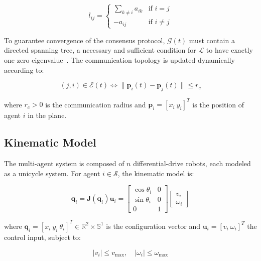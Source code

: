 \begin{equation}
    l_{ij} =
    \begin{cases}
        \sum_{k \neq i} a_{ik} & \text{if } i = j \\
        -a_{ij} & \text{if } i \neq j
    \end{cases}
    \label{eq:laplacian}
\end{equation}

To guarantee convergence of the consensus protocol, $\mathcal{G}(t)$ must contain a directed spanning tree, a necessary and sufficient condition for $\mathcal{L}$ to have exactly one zero eigenvalue~\cite{ren2006consensus,mesbahi2010graph}. The communication topology is updated dynamically according to:

\begin{equation}
    (j,i) \in \mathcal{E}(t) \iff \| \mathbf{p}_i(t) - \mathbf{p}_j(t) \| \leq r_c
    \label{eq:topology}
\end{equation}

\noindent where $r_c > 0$ is the communication radius and $\mathbf{p}_i = [x_i\ y_i]^T$ is the position of agent $i$ in the plane.

\subsection{Kinematic Model}

The multi-agent system is composed of $n$ differential-drive robots, each modeled as a unicycle system. For agent $i \in \mathcal{S}$, the kinematic model is:

\begin{equation}
    \dot{\mathbf{q}}_i = \mathbf{J}(\mathbf{q}_i)\mathbf{u}_i =
    \begin{bmatrix}
        \cos\theta_i & 0 \\
        \sin\theta_i & 0 \\
        0 & 1
    \end{bmatrix}
    \begin{bmatrix}
        v_i \\ \omega_i
    \end{bmatrix}
    \label{eq:unicycle_multi}
\end{equation}

\noindent where $\mathbf{q}_i = [x_i\ y_i\ \theta_i]^T \in \mathbb{R}^2 \times \mathbb{S}^1$ is the configuration vector and $\mathbf{u}_i = [v_i\ \omega_i]^T$ the control input, subject to:

\begin{equation}
    |v_i| \leq v_{\max}, \quad |\omega_i| \leq \omega_{\max}
    \label{eq:vel_limits}
\end{equation}

